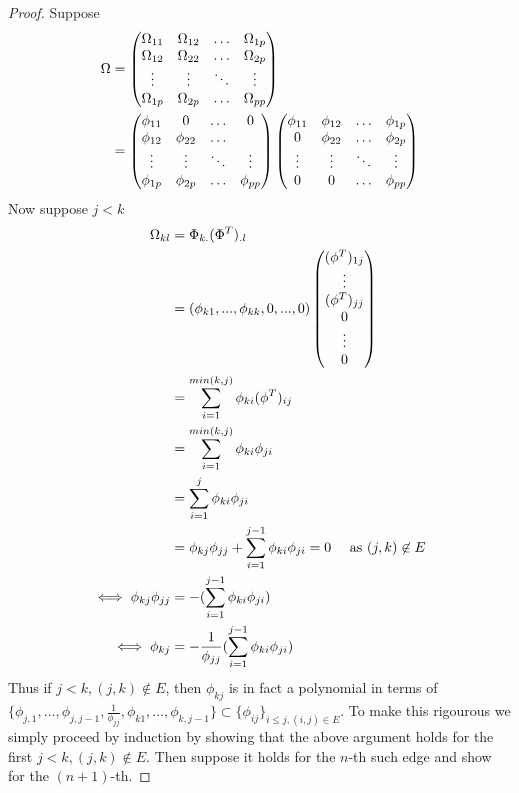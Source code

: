 \documentclass[12pt, leqno]{article}
\def\om{\ensuremath\Omega}
\begin{document}
\begin{proof}
Suppose 
\begin{align*}
\om &= \begin{pmatrix} 
\om_{11} & \om_{12} & \hdots & \om_{1p}\\
\om_{12} &\om_{22} & \hdots&  \om_{2p} \\
\vdots & \vdots &\ddots& \vdots\\
\om_{1p} &\om_{2p}& \hdots & \om_{pp} 
\end{pmatrix} \\
&= \begin{pmatrix} 
\phi_{11} & 0 & \hdots &0\\
\phi_{12} &\phi_{22} & \hdots&  \\
\vdots & \vdots &\ddots& \vdots\\
\phi_{1p} &\phi_{2p} & \hdots & \phi_{pp} 
\end{pmatrix} 
\begin{pmatrix} 
\phi_{11} & \phi_{12} & \hdots & \phi_{1p}\\
0 &\phi_{22} & \hdots&  \phi_{2p} \\
\vdots & \vdots &\ddots& \vdots\\
0 &0 & \hdots & \phi_{pp} 
\end{pmatrix} \\
\end{align*}
Now suppose $j<k$
\begin{align*}
\om_{kl} &= \Phi_{k.}(\Phi^T)_{.l} \\
&= (\phi_{k1},...,\phi_{kk},0,...,0)\begin{pmatrix} 
(\phi^T)_{1j} \\
\vdots \\
(\phi^T)_{jj} \\
0\\
\vdots\\
0
\end{pmatrix} \\
&= \sum_{i=1}^{min(k,j)} \phi_{ki}(\phi^T)_{ij} \\
&= \sum_{i=1}^{min(k,j)} \phi_{ki}\phi_{ji} \\
&= \sum_{i=1}^j \phi_{ki}\phi_{ji} \\
&= \phi_{kj}\phi_{jj} + \sum_{i=1}^{j-1} \phi_{ki}\phi_{ji} = 0 \quad
  \text{ as } (j,k) \not\in E \\
\iff \phi_{kj}\phi_{jj} &= -(\sum_{i=1}^{j-1} \phi_{ki}\phi_{ji})\\
\iff \phi_{kj}&= -\frac{1}{\phi_{jj}}(\sum_{i=1}^{j-1} \phi_{ki}\phi_{ji})
\end{align*}
Thus if $j<k, (j,k) \not\in E$, then $\phi_{kj}$ is in fact a polynomial in
terms of  $\{\phi_{j,1},...,\phi_{j,
  j-1},\frac{1}{\phi_{jj}},\phi_{k1},...,\phi_{k,j-1}\} \subset
\{\phi_{ij}\}_{i \leq j, (i,j) \in E}$. To make this rigourous we
simply proceed by induction by showing that the above argument holds
for the first $j<k, (j,k) \not\in E$. Then suppose it holds for the
$n$-th such edge and show for the $(n+1)$-th.
\end{proof}
\end{document}
